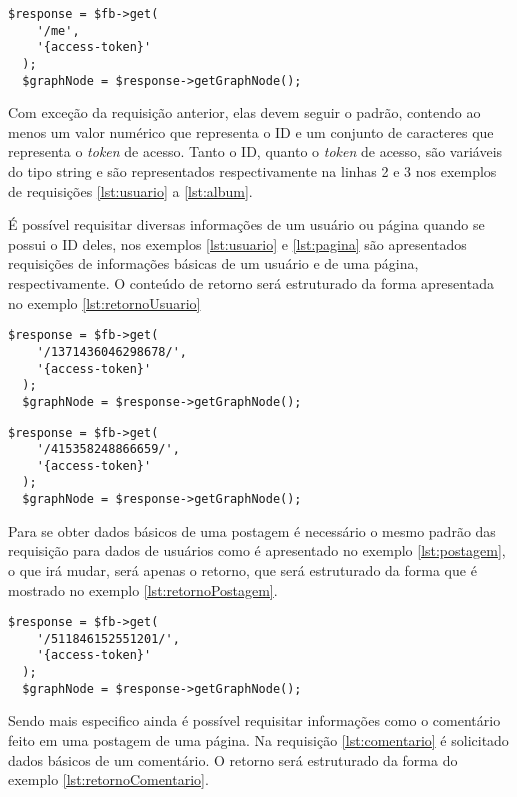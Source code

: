 \begin{lstlisting}[caption={Requisitar informações do próprio usuário},label={lst:me}]
  $response = $fb->get(
    '/me',
    '{access-token}'
  );
  $graphNode = $response->getGraphNode();
\end{lstlisting}

Com exceção da requisição anterior, elas devem seguir o padrão, contendo ao menos um valor numérico que representa o ID e um conjunto de caracteres que representa o \textit{token} de acesso. Tanto o ID, quanto o \textit{token} de acesso, são variáveis do tipo string e são representados respectivamente na linhas 2 e 3 nos exemplos de requisições \ref{lst:usuario} a \ref{lst:album}.

É possível requisitar diversas informações de um usuário ou página quando se possui o ID deles, nos exemplos \ref{lst:usuario} e \ref{lst:pagina} são apresentados requisições de informações básicas de um usuário e de uma página, respectivamente. O conteúdo de retorno será estruturado da forma apresentada no exemplo \ref{lst:retornoUsuario}  

\begin{lstlisting}[caption={Requisitar informações de um usuário específico},label={lst:usuario}]
  $response = $fb->get(
    '/1371436046298678/',
    '{access-token}'
  );
  $graphNode = $response->getGraphNode();
\end{lstlisting}

\begin{lstlisting}[caption={Requisitar informações de uma página},label={lst:pagina}]
  $response = $fb->get(
    '/415358248866659/',
    '{access-token}'
  );
  $graphNode = $response->getGraphNode();
\end{lstlisting}

Para se obter dados básicos de uma postagem é necessário o mesmo padrão das requisição para dados de usuários como é apresentado no exemplo \ref{lst:postagem}, o que irá mudar, será apenas o retorno, que será estruturado da forma que é mostrado no exemplo \ref{lst:retornoPostagem}.

\begin{lstlisting}[caption={Requisitar informações de uma postagem específica},label={lst:postagem}]
  $response = $fb->get(
    '/511846152551201/',
    '{access-token}'
  );
  $graphNode = $response->getGraphNode();
\end{lstlisting}

Sendo mais especifico ainda é possível requisitar informações como o comentário feito em uma postagem de uma página. Na requisição \ref{lst:comentario} é solicitado dados básicos de um comentário. O retorno será estruturado da forma do exemplo \ref{lst:retornoComentario}.

